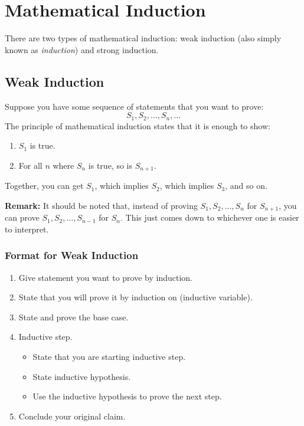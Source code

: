 \documentclass[letterpaper]{article}
\begin{document}
\newpage
{}


\section{Mathematical Induction}
There are two types of mathematical induction: weak induction (also simply known as \emph{induction}) and strong induction. 

\subsection{Weak Induction}
Suppose you have some sequence of statements that you want to prove:
\[ S_1, S_2, \dots, S_n, ...\]
The principle of mathematical induction states that it is enough to show:
\begin{enumerate}
    \item $S_1$ is true.
    \item For all $n$ where $S_n$ is true, so is $S_{n + 1}$. 
\end{enumerate}
Together, you can get $S_1$, which implies $S_2$, which implies $S_3$, and so on. 

\bigskip 

\textbf{Remark:} It should be noted that, instead of proving $S_1, S_2, \dots, S_n$ for $S_{n + 1}$, you can prove $S_1, S_2, \dots, S_{n - 1}$ for $S_n$. This just comes down to whichever one is easier to interpret. 

\subsubsection{Format for Weak Induction}
\begin{enumerate}
    \item Give statement you want to prove by induction. 
    \item State that you will prove it by induction on (inductive variable). 
    \item State and prove the base case.
    \item Inductive step.
    \begin{itemize}
        \item State that you are starting inductive step.
        \item State inductive hypothesis. 
        \item Use the inductive hypothesis to prove the next step.
    \end{itemize}
    \item Conclude your original claim. 
\end{enumerate}
\end{document}
